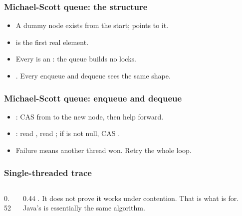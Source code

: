 \documentclass[aspectratio=169,10pt,compress]{beamer}
\begin{document}
\begin{frame}[t,fragile] \frametitle{Michael-Scott queue: the structure}
  \begin{itemize}\small
    \item A dummy node exists from the start;  points to it.
    \item {} is the first real element.
    \item Every  is an : the queue
          builds no locks.
    \item {}. Every enqueue
          and dequeue sees the same shape.
  \end{itemize}
\end{frame}




\begin{frame}[t,fragile] \frametitle{Michael-Scott queue: enqueue and dequeue}
  \begin{itemize}\small
    \item {}: CAS  from  to the new node,
          then help  forward.
    \item {}: read , read ;
          if  is not null, CAS .
    \item Failure means another thread won. Retry the whole loop.
  \end{itemize}
\end{frame}




\begin{frame}[t,fragile] \frametitle{Single-threaded trace}
  \begin{columns}[T]
    \begin{column}{0.52\textwidth}
    \end{column}
    \begin{column}{0.44\textwidth}
      \small
      . It does not prove it
      works under contention. That is what  is for.
      Java's  is essentially the same
      algorithm.
    \end{column}
  \end{columns}
\end{frame}
\end{document}
